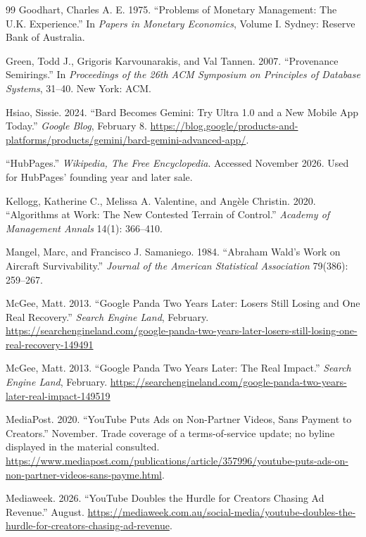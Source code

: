 \documentclass[11pt]{article}
\theoremstyle{remark}
\begin{document}
\begin{thebibliography}{99}
Goodhart, Charles A. E. 1975. ``Problems of Monetary Management: The U.K. Experience.'' In \emph{Papers in Monetary Economics}, Volume I. Sydney: Reserve Bank of Australia.

Green, Todd J., Grigoris Karvounarakis, and Val Tannen. 2007. ``Provenance Semirings.'' In \emph{Proceedings of the 26th ACM Symposium on Principles of Database Systems}, 31--40. New York: ACM.

Hsiao, Sissie. 2024. ``Bard Becomes Gemini: Try Ultra 1.0 and a New Mobile App Today.'' \emph{Google Blog}, February 8. \url{https://blog.google/products-and-platforms/products/gemini/bard-gemini-advanced-app/}.

``HubPages.'' \emph{Wikipedia, The Free Encyclopedia}. Accessed November 2026. Used for HubPages' founding year and later sale.

Kellogg, Katherine C., Melissa A. Valentine, and Ang\`ele Christin. 2020. ``Algorithms at Work: The New Contested Terrain of Control.'' \emph{Academy of Management Annals} 14(1): 366--410.

Mangel, Marc, and Francisco J. Samaniego. 1984. ``Abraham Wald's Work on Aircraft Survivability.'' \emph{Journal of the American Statistical Association} 79(386): 259--267.

McGee, Matt. 2013. ``Google Panda Two Years Later: Losers Still Losing and One Real Recovery.'' \emph{Search Engine Land}, February. \url{https://searchengineland.com/google-panda-two-years-later-losers-still-losing-one-real-recovery-149491}

McGee, Matt. 2013. ``Google Panda Two Years Later: The Real Impact.'' \emph{Search Engine Land}, February. \url{https://searchengineland.com/google-panda-two-years-later-real-impact-149519}

MediaPost. 2020. ``YouTube Puts Ads on Non-Partner Videos, Sans Payment to Creators.'' November. Trade coverage of a terms-of-service update; no byline displayed in the material consulted. \url{https://www.mediapost.com/publications/article/357996/youtube-puts-ads-on-non-partner-videos-sans-payme.html}.

Mediaweek. 2026. ``YouTube Doubles the Hurdle for Creators Chasing Ad Revenue.'' August. \url{https://mediaweek.com.au/social-media/youtube-doubles-the-hurdle-for-creators-chasing-ad-revenue}.


\end{thebibliography}
\end{document}
